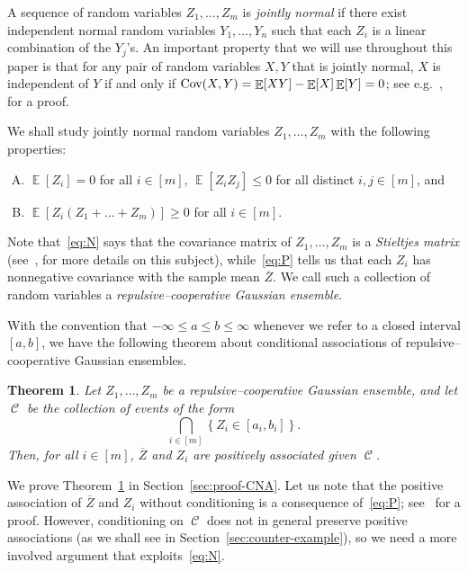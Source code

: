 \documentclass[12pt,english,reqno]{amsart}
\theoremstyle{plain}
\newtheorem{thm}{Theorem}[section]
\theoremstyle{remark}
\numberwithin{figure}{section}
\numberwithin{equation}{section}
\def\bZ{\overline{Z}}
\DeclareMathOperator{\Cov}{\textnormal{Cov}} %
\DeclareMathOperator{\Eb}{\mathbb{E}} %
\DeclareMathOperator{\cC}{\mathcal{C}} %
\newcommand{\com}[2]{\textcolor{blue}{\texttt{#1 comment: #2}}}
\newcommand{\darkblue}{\color{darkblue}}
\newcommand{\defnb}[1]{\emph{\darkblue #1}}
\begin{document}
A sequence of random variables $Z_1,\dots, Z_m$ is \defnb{jointly normal} if there exist independent normal random variables $Y_1,\dots, Y_n$ such that each $Z_i$ is a linear combination of the $Y_j$'s. An important property that we will use throughout this paper is that for any pair of random variables $X, Y$ that is jointly normal, $X$ is independent of $Y$ if and only if $\Cov(X,Y)=\Eb[XY] - \Eb[X]\Eb[Y] = 0$; see e.g.~\citep{BH}, for a proof.

We shall study jointly normal random variables $Z_1,\dots, Z_m$ with the following properties:
\begin{enumerate}[(A)]
	\item\label{eq:N} $\Eb[Z_i] = 0$ for all $i \in [m]$, $\Eb[Z_i Z_j ] \leq 0$ for all distinct $i,j \in [m]$, and
	\item\label{eq:P} $\Eb[Z_i (Z_1+\dots +Z_m)] \geq 0$ for all $i \in [m]$.
\end{enumerate}
Note that~\ref{eq:N} says that the covariance matrix of $Z_1,\dots, Z_m$ is a \defnb{Stieltjes matrix} (see~\citep{KR}, for more details on this subject), while~\ref{eq:P} tells us that each $Z_i$ has nonnegative covariance with the sample mean $\bZ$. We call such a collection of random variables a \defnb{repulsive–cooperative Gaussian ensemble}.

With the convention that $-\infty \le a \le b \le \infty$ whenever we refer to a closed interval $[a,b]$, we have the following theorem about conditional associations of repulsive–cooperative Gaussian ensembles.

\begin{thm}\label{thm:CNA}
	Let $Z_1,\dots, Z_{m}$ be a repulsive–cooperative Gaussian ensemble, and let $\cC$ be the collection of events of the form
	\begin{equation}\label{eq:cond}
		\bigcap_{i\in[m]} \left\{ Z_i \in [a_i,b_i] \right \}.
	\end{equation}
	Then, for all $i \in [m]$, $\bZ$ and $Z_i$ are positively associated given $\cC$.
\end{thm}

We prove Theorem~\ref{thm:CNA} in Section~\ref{sec:proof-CNA}.
Let us note that the positive association of $\bZ$ and $Z_i$ without conditioning is a consequence of~\ref{eq:P}; see~\citep{Pitt} for a proof. However, conditioning on $\cC$ does not in general preserve positive associations (as we shall see in Section~\ref{sec:counter-example}), so we need a more involved argument that exploits~\ref{eq:N}.
\end{document}
